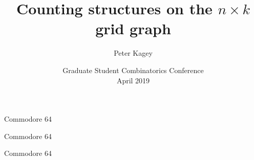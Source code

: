 \documentclass{beamer}%
\title[Leaf Free]{Counting structures on the $n \times k$ grid graph}
\author{Peter Kagey}
\institute{University of Southern California}
\date[]{
  Graduate Student Combinatorics Conference\\
  April 2019
}
\begin{document}
\begin{frame}
  \titlepage
\end{frame}


\begin{frame}{Commodore 64} %
\end{frame}

\begin{frame}{Commodore 64} %
\end{frame}

\begin{frame}{Commodore 64} %
\end{frame}
\end{document}

